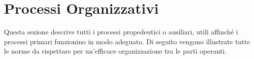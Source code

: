 \section{Processi Organizzativi}
	Questa sezione descrive tutti i processi propedeutici o ausiliari, utili affinché i processi primari funzionino in modo adeguato. Di seguito vengono illustrate tutte le norme da rispettare per un'efficace organizzazione tra le parti operanti.

	
	
